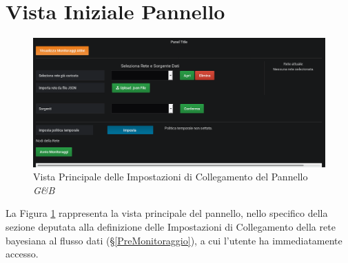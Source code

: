 \section{Vista Iniziale Pannello}\label{VistaPanel}

\begin{figure}[H]
	\begin{center}
		\includegraphics[scale=0.4]{./images/Panel.png}
		 \caption{Vista Principale delle Impostazioni di Collegamento del Pannello \textit{G\&B}}	
		 \label{Pannello}
	\end{center}
\end{figure}

La Figura \ref{Pannello} rappresenta la vista principale del pannello, nello specifico della sezione deputata alla definizione delle Impostazioni di Collegamento della rete bayesiana al flusso dati (§\ref{PreMonitoraggio}), a cui l'utente ha immediatamente accesso.

